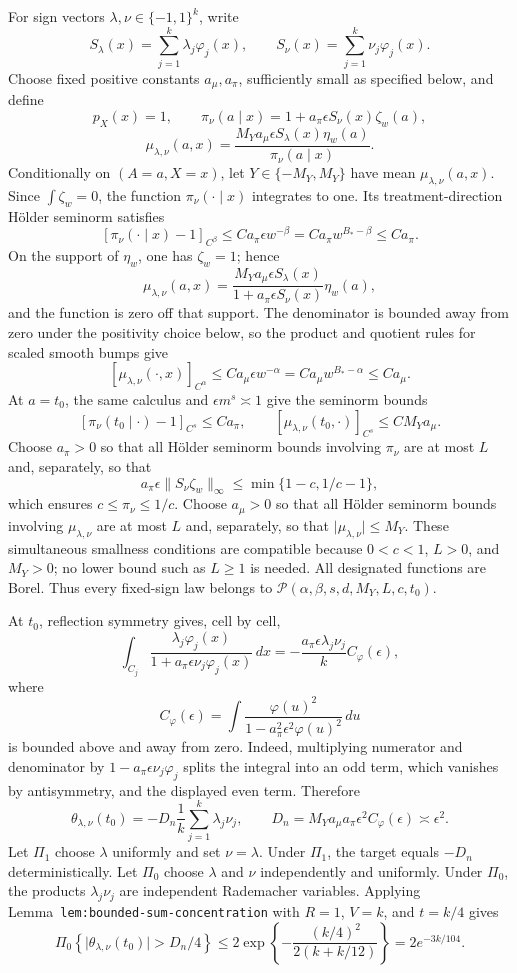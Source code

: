 For sign vectors \(\lambda,\nu\in\{-1,1\}^k\), write
\[
S_\lambda(x)=\sum_{j=1}^k\lambda_j\varphi_j(x),
\qquad
S_\nu(x)=\sum_{j=1}^k\nu_j\varphi_j(x).
\]
Choose fixed positive constants \(a_\mu,a_\pi\), sufficiently small as specified below, and define
\[
p_X(x)=1,
\qquad
\pi_\nu(a\mid x)=1+a_\pi\epsilon S_\nu(x)\zeta_w(a),
\]
\[
\mu_{\lambda,\nu}(a,x)
=
\frac{M_Ya_\mu\epsilon S_\lambda(x)\eta_w(a)}
{\pi_\nu(a\mid x)}.
\]
Conditionally on \((A=a,X=x)\), let \(Y\in\{-M_Y,M_Y\}\) have mean \(\mu_{\lambda,\nu}(a,x)\). Since \(\int\zeta_w=0\), the function \(\pi_\nu(\cdot\mid x)\) integrates to one. Its treatment-direction H\"older seminorm satisfies
\[
[\pi_\nu(\cdot\mid x)-1]_{C^\beta}
\le C a_\pi\epsilon w^{-\beta}
=C a_\pi w^{B_*-\beta}
\le C a_\pi.
\]
On the support of \(\eta_w\), one has \(\zeta_w=1\); hence
\[
\mu_{\lambda,\nu}(a,x)
=
\frac{M_Ya_\mu\epsilon S_\lambda(x)}
{1+a_\pi\epsilon S_\nu(x)}\eta_w(a),
\]
and the function is zero off that support. The denominator is bounded away from zero under the positivity choice below, so the product and quotient rules for scaled smooth bumps give
\[
[\mu_{\lambda,\nu}(\cdot,x)]_{C^\alpha}
\le C a_\mu\epsilon w^{-\alpha}
=C a_\mu w^{B_*-\alpha}
\le C a_\mu.
\]
At \(a=t_0\), the same calculus and \(\epsilon m^s\asymp1\) give the seminorm bounds
\[
[\pi_\nu(t_0\mid\cdot)-1]_{C^s}\le C a_\pi,
\qquad
[\mu_{\lambda,\nu}(t_0,\cdot)]_{C^s}\le C M_Ya_\mu.
\]
Choose \(a_\pi>0\) so that all H\"older seminorm bounds involving \(\pi_\nu\) are at most \(L\) and, separately, so that
\[
a_\pi\epsilon\lVert S_\nu\zeta_w\rVert_\infty
\le\min\{1-c,1/c-1\},
\]
which ensures \(c\le\pi_\nu\le1/c\). Choose \(a_\mu>0\) so that all H\"older seminorm bounds involving \(\mu_{\lambda,\nu}\) are at most \(L\) and, separately, so that \(\lvert\mu_{\lambda,\nu}\rvert\le M_Y\). These simultaneous smallness conditions are compatible because \(0<c<1\), \(L>0\), and \(M_Y>0\); no lower bound such as \(L\ge1\) is needed. All designated functions are Borel. Thus every fixed-sign law belongs to \(\mathcal P(\alpha,\beta,s,d,M_Y,L,c,t_0)\).

At \(t_0\), reflection symmetry gives, cell by cell,
\[
\int_{C_j}
\frac{\lambda_j\varphi_j(x)}{1+a_\pi\epsilon\nu_j\varphi_j(x)}\,dx
=
-\frac{a_\pi\epsilon\lambda_j\nu_j}{k}C_\varphi(\epsilon),
\]
where
\[
C_\varphi(\epsilon)
=
\int
\frac{\varphi(u)^2}{1-a_\pi^2\epsilon^2\varphi(u)^2}\,du
\]
is bounded above and away from zero. Indeed, multiplying numerator and denominator by \(1-a_\pi\epsilon\nu_j\varphi_j\) splits the integral into an odd term, which vanishes by antisymmetry, and the displayed even term. Therefore
\[
\theta_{\lambda,\nu}(t_0)
=
-D_n\frac1k\sum_{j=1}^k\lambda_j\nu_j,
\qquad
D_n=M_Ya_\mu a_\pi\epsilon^2C_\varphi(\epsilon)
\asymp\epsilon^2.
\]
Let \(\Pi_1\) choose \(\lambda\) uniformly and set \(\nu=\lambda\). Under \(\Pi_1\), the target equals \(-D_n\) deterministically. Let \(\Pi_0\) choose \(\lambda\) and \(\nu\) independently and uniformly. Under \(\Pi_0\), the products \(\lambda_j\nu_j\) are independent Rademacher variables. Applying Lemma~\texttt{lem:bounded-sum-concentration} with \(R=1\), \(V=k\), and \(t=k/4\) gives
\[
\Pi_0\left\{\lvert\theta_{\lambda,\nu}(t_0)\rvert>D_n/4\right\}
\le
2\exp\left\{-\frac{(k/4)^2}{2(k+k/12)}\right\}
=2e^{-3k/104}.
\]

